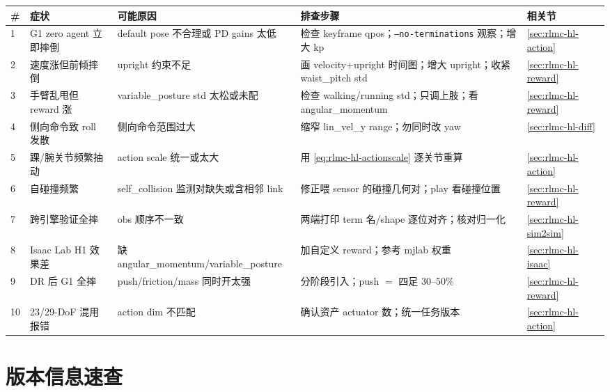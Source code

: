 \begin{center}
\small
\begin{tabular}{p{0.4cm}p{3.0cm}p{3.2cm}p{4.2cm}p{1.4cm}}
\hline
\# & 症状 & 可能原因 & 排查步骤 & 相关节 \\
\hline
1 & G1 zero agent 立即摔倒 & default pose 不合理或 PD gains 太低 & 检查 keyframe qpos；\texttt{--no-terminations} 观察；增大 kp & \cref{sec:rlmc-hl-action} \\
2 & 速度涨但前倾摔倒 & upright 约束不足 & 画 velocity+upright 时间图；增大 upright；收紧 waist\_pitch std & \cref{sec:rlmc-hl-reward} \\
3 & 手臂乱甩但 reward 涨 & variable\_posture std 太松或未配 & 检查 walking/running std；只调上肢；看 angular\_momentum & \cref{sec:rlmc-hl-reward} \\
4 & 侧向命令致 roll 发散 & 侧向命令范围过大 & 缩窄 lin\_vel\_y range；勿同时改 yaw & \cref{sec:rlmc-hl-diff} \\
5 & 踝/腕关节频繁抽动 & action scale 统一或太大 & 用 \eqref{eq:rlmc-hl-actionscale} 逐关节重算 & \cref{sec:rlmc-hl-action} \\
6 & 自碰撞频繁 & self\_collision 监测对缺失或含相邻 link & 修正喂 sensor 的碰撞几何对；play 看碰撞位置 & \cref{sec:rlmc-hl-reward} \\
7 & 跨引擎验证全摔 & obs 顺序不一致 & 两端打印 term 名/shape 逐位对齐；核对归一化 & \cref{sec:rlmc-hl-sim2sim} \\
8 & Isaac Lab H1 效果差 & 缺 angular\_momentum/variable\_posture & 加自定义 reward；参考 mjlab 权重 & \cref{sec:rlmc-hl-isaac} \\
9 & DR 后 G1 全摔 & push/friction/mass 同时开太强 & 分阶段引入；push $=$ 四足 $30$--$50\%$ & \cref{sec:rlmc-hl-reward} \\
10 & 23/29-DoF 混用报错 & action dim 不匹配 & 确认资产 actuator 数；统一任务版本 & \cref{sec:rlmc-hl-action} \\
\hline
\end{tabular}
\end{center}

\section*{版本信息速查}


